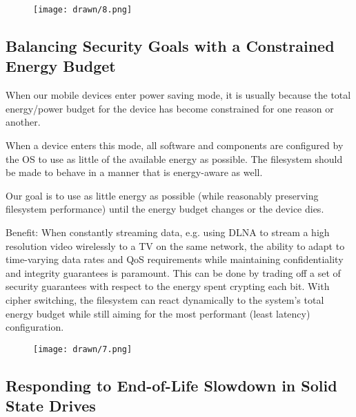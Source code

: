 \begin{figure}[ht]
 \centering
  \texttt{[image: drawn/8.png]}
   \caption{}\label{fig:mirrored-vs-selective}
\end{figure}

\subsection{Balancing Security Goals with a Constrained Energy Budget}

When our mobile devices enter power saving mode, it is usually because the total
energy/power budget for the device has become constrained for one reason or
another.

When a device enters this mode, all software and components are configured by
the OS to use as little of the available energy as possible. The filesystem
should be made to behave in a manner that is energy-aware as well.

Our goal is to use as little energy as possible (while reasonably preserving
filesystem performance) until the energy budget changes or the device dies.

Benefit: When constantly streaming data, e.g. using DLNA to stream a high
resolution video wirelessly to a TV on the same network, the ability to adapt to
time-varying data rates and QoS requirements while maintaining confidentiality
and integrity guarantees is paramount. This can be done by trading off a set of
security guarantees with respect to the energy spent crypting each bit. With
cipher switching, the filesystem can react dynamically to the system's total
energy budget while still aiming for the most performant (least latency)
configuration.


\begin{figure}[ht]
 \centering
  \texttt{[image: drawn/7.png]}
   \caption{}\label{fig:energy-budget}
\end{figure}

\subsection{Responding to End-of-Life Slowdown in Solid State Drives}

